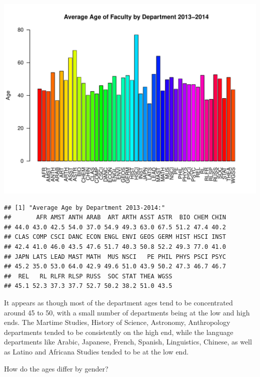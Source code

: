\documentclass[12pt,a4paper]{article}\usepackage[]{graphicx}\usepackage[]{color}
\makeatletter
\def\maxwidth{ %
  \ifdim\Gin@nat@width>\linewidth
    \linewidth
  \else
    \Gin@nat@width
  \fi
}
\newenvironment{kframe}{%
 \def\at@end@of@kframe{}%
 \ifinner\ifhmode%
  \def\at@end@of@kframe{\end{minipage}}%
  \begin{minipage}{\columnwidth}%
 \fi\fi%
 \def\FrameCommand##1{\hskip\@totalleftmargin \hskip-\fboxsep
 \colorbox{shadecolor}{##1}\hskip-\fboxsep
     \hskip-\linewidth \hskip-\@totalleftmargin \hskip\columnwidth}%
 \MakeFramed {\advance\hsize-\width
   \@totalleftmargin\z@ \linewidth\hsize
   \@setminipage}}%
 {\par\unskip\endMakeFramed%
 \at@end@of@kframe}
\newenvironment{knitrout}{}{} %
\theoremstyle{definition}
\makeatother
\begin{document}
\begin{knitrout}
\includegraphics[width=\maxwidth]{figure/unnamed-chunk-10-10} 
\begin{kframe}\begin{verbatim}
## [1] "Average Age by Department 2013-2014:"
##       AFR AMST ANTH ARAB  ART ARTH ASST ASTR  BIO CHEM CHIN 
## 44.0 43.0 42.5 54.0 37.0 54.9 49.3 63.0 67.5 51.2 47.4 40.2 
## CLAS COMP CSCI DANC ECON ENGL ENVI GEOS GERM HIST HSCI INST 
## 42.4 41.0 46.0 43.5 47.6 51.7 40.3 50.8 52.2 49.3 77.0 41.0 
## JAPN LATS LEAD MAST MATH  MUS NSCI   PE PHIL PHYS PSCI PSYC 
## 45.2 35.0 53.0 64.0 42.9 49.6 51.0 43.9 50.2 47.3 46.7 46.7 
##  REL   RL RLFR RLSP RUSS  SOC STAT THEA WGSS 
## 45.1 52.3 37.3 37.7 52.7 50.2 38.2 51.0 43.5
\end{verbatim}
\end{kframe}
\end{knitrout}

\bigskip
It appears as though most of the department ages tend to be concentrated around 45 to 50, with a small number of departments being at the low and high ends. The Martime Studies, History of Science, Astronomy, Anthropology departments tended to be consistently on the high end, while the language departments like Arabic, Japanese, French, Spanish, Linguistics, Chinese, as well as Latino and Africana Studies tended to be at the low end.

\bigskip
How do the ages differ by gender?
\end{document}
